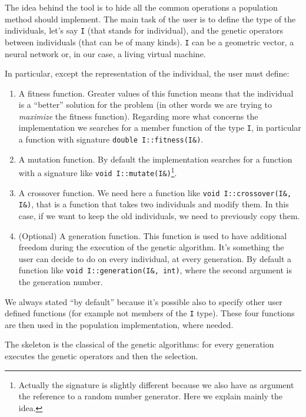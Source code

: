 \documentclass{report}
\begin{document}
The idea behind the tool is to hide all the common operations a population method should implement. The main task of the user is to define the type of the individuals, let's say \texttt{I} (that stands for individual), and the genetic operators between individuals (that can be of many kinds). \texttt{I} can be a geometric vector, a neural network or, in our case, a living virtual machine.

In particular, except the representation of the individual, the user must define:

\begin{enumerate}
\item A fitness function. Greater values of this function means that the individual is a ``better'' solution for the problem (in other words we are trying to \textit{maximize} the fitness function). Regarding more what concerns the implementation we searches for a member function of the type \texttt{I}, in particular a function with signature \texttt{double I::fitness(I\&)}.

\item A mutation function. By default the implementation searches for a function with a signature like \texttt{void I::mutate(I\&)}\footnote{Actually the signature is slightly different because we also have as argument the reference to a random number generator. Here we explain mainly the idea.}.

\item A crossover function. We need here a function like \texttt{void I::crossover(I\&, I\&)}, that is a function that takes two individuals and modify them. In this case, if we want to keep the old individuals, we need to previously copy them.

\item (Optional) A generation function. This function is used to have additional freedom during the execution of the genetic algorithm. It's something the user can decide to do on every individual, at every generation. By default a function like \texttt{void I::generation(I\&, int)}, where the second argument is the generation number.
\end{enumerate}

We always stated ``by default'' because it's possible also to specify other user defined functions (for example not members of the \texttt{I} type). These four functions are then used in the population implementation, where needed.

The skeleton is the classical of the genetic algorithms: for every generation executes the genetic operators and then the selection.
\end{document}

